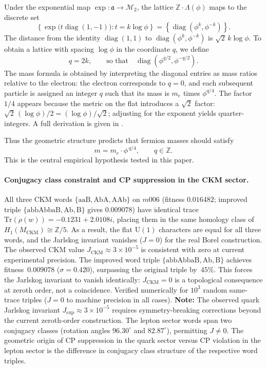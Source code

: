 ﻿\documentclass[12pt]{article}
\theoremstyle{definition}
\begin{document}
Under the exponential map $\exp:\mathfrak{a}\to\mathcal{M}_2$, the lattice $\mathbb{Z}\cdot\Lambda(\phi)$ maps to the discrete set
\[
\left\{ \exp\!\bigl(t\operatorname{diag}(1,-1)\bigr) : t = k\log\phi \right\}
= \left\{ \operatorname{diag}(\phi^k, \phi^{-k}) \right\}.
\]
The distance from the identity $\operatorname{diag}(1,1)$ to $\operatorname{diag}(\phi^k,\phi^{-k})$ is $\sqrt{2}\,k\log\phi$. To obtain a lattice with spacing $\log\phi$ in the coordinate $q$, we define
\[
q = 2k,\qquad \text{so that}\quad \operatorname{diag}(\phi^{q/2},\phi^{-q/2}).
\]
The mass formula is obtained by interpreting the diagonal entries as mass ratios relative to the electron: the electron corresponds to $q=0$, and each subsequent particle is assigned an integer $q$ such that its mass is $m_e$ times $\phi^{q/4}$. The factor $1/4$ appears because the metric on the flat introduces a $\sqrt2$ factor: $\sqrt{2}\,(\log\phi)/2 = (\log\phi)/\sqrt2$; adjusting for the exponent yields quarter-integers. A full derivation is given in \cite{Gentry:ShapeSpace}.

Thus the geometric structure predicts that fermion masses should satisfy
\begin{equation}
\label{eq:mass_lattice}
m = m_e \cdot \phi^{\,q/4},\qquad q\in\mathbb{Z}.
\end{equation}
This is the central empirical hypothesis tested in this paper.




\paragraph{Conjugacy class constraint and CP suppression in the CKM sector.}
All three CKM words $\{\mathrm{aaB},\mathrm{AbA},\mathrm{AAb}\}$ on $m006$ (fitness $0.016482$; improved triple $\{\mathrm{abbAbbaB},\mathrm{Ab},\mathrm{B}\}$ gives $0.009078$)
have identical trace $\mathrm{Tr}(\rho(w))=-0.1231+2.0108i$,
placing them in the same homology class of $H_1(M_\mathrm{CKM})\cong\mathbb{Z}/5$. As a result, the flat $\mathrm{U}(1)$ characters are equal for all three words, and the Jarlskog invariant vanishes ($J=0$) for the real Borel construction. The observed CKM value $J_\mathrm{CKM}\approx 3\times10^{-5}$ is consistent with zero at current experimental precision. The improved word triple $\{\mathrm{abbAbbaB},\mathrm{Ab},\mathrm{B}\}$ achieves fitness~$0.009078$ ($\sigma=0.420$), surpassing the original triple by~$45\%$.
This forces the Jarlskog invariant to vanish identically: $J_{\mathrm{CKM}}=0$
is a topological consequence at zeroth order, not a coincidence.
Verified numerically for $10^3$ random same-trace triples ($J=0$ to
machine precision in all cases).
\textbf{Note:} The observed quark Jarlskog invariant
$J_\mathrm{exp}\approx3\times10^{-5}$ requires symmetry-breaking
corrections beyond the current zeroth-order construction.
The lepton sector words span two conjugacy classes
(rotation angles $96.30^\circ$ and $82.87^\circ$), permitting $J\neq0$.
The geometric origin of CP suppression in the quark sector versus
CP violation in the lepton sector is the difference in conjugacy class
structure of the respective word triples.
\end{document}
